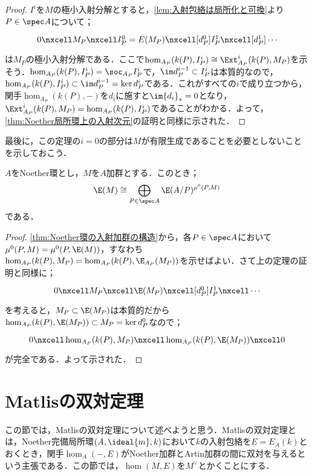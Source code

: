 \begin{proof}
	$I^i$を$M$の極小入射分解とすると，\ref{lem:入射包絡は局所化と可換}より$P\in\spec A$について；
	\[\begin{tikzcd}
	0\nxcell M_P\nxcell I^0_P=E(M_P)\nxcell[d^0_P] I^1_P\nxcell[d^1_P]\cdots
	\end{tikzcd}\]
	は$M_P$の極小入射分解である．ここで$\hom_{A_P}(k(P),I^i_P)\cong\Ext^i_{A_P}(k(P),M_P)$を示そう．$\hom_{A_P}(k(P),I^i_P)=\soc_{A_P}I^i_P$で，$\im d^{i-1}_P\subset I^i_P$は本質的なので，$\hom_{A_P}(k(P),I^i_P)\subset\im d^{i-1}_P=\ker d^i_P$である．これがすべての$i$で成り立つから，関手$\hom_{A_P}(k(P),-)$を$d_i$に施すと$\im {d_i}_\ast=0$となり，$\Ext^i_{A_P}(k(P),M_P)=\hom_{A_P}(k(P),I^i_P)$であることがわかる．よって，\ref{thm:Noether局所環上の入射次元}の証明と同様に示された．
\end{proof}

最後に，この定理の$i=0$の部分は$M$が有限生成であることを必要としないことを示しておこう．

\begin{cor}
	$A$をNoether環とし，$M$を$A$加群とする．このとき；
	\[\E(M)\cong\bigoplus_{P\in\spec A}\E(A/P)^{\mu^0(P,M)}\]
	である．
\end{cor}

\begin{proof}
	\ref{thm:Noether環の入射加群の構造}から，各$P\in\spec A$において$\mu^0(P,M)=\mu^0(P,\E(M))$，すなわち$\hom_{A_P}(k(P),M_P)=\hom_{A_P}(k(P),\E_{A_P}(M_P))$を示せばよい．さて上の定理の証明と同様に；
	\[\begin{tikzcd}
		0\nxcell M_P\nxcell \E(M_P)\nxcell[d^0_P]I_P^1\nxcell\cdots
	\end{tikzcd}\]
	を考えると，$M_P\subset\E(M_P)$は本質的だから$\hom_{A_P}(k(P),\E(M_P))\subset M_P=\ker d^0_P$なので；
	\[\begin{tikzcd}
		0\nxcell\hom_{A_P}(k(P),M_P)\nxcell\hom_{A_P}(k(P),\E(M_P))\nxcell0
	\end{tikzcd}\]
	が完全である．よって示された．
\end{proof}


\section{Matlisの双対定理}
この節では，Matlisの双対定理について述べようと思う．Matlisの双対定理とは，Noether完備局所環$(A,\ideal{m},k)$において$k$の入射包絡を$E=E_A(k)$とおくとき，関手$\hom_A(-,E)$がNoether加群とArtin加群の間に双対を与えるという主張である．この節では，$\hom(M,E)$を$M^\vee$とかくことにする．

